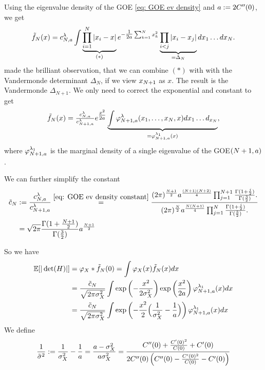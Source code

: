 Using the eigenvalue density of the GOE \eqref{eq: GOE ev density} and
\(a:=2C''(0)\), we get 
\[
	\tilde{f}_N(x)
	= c^\lambda_{N,a}\int
	\underbrace{
	\prod_{i=1}^N \left|
		x_i - x
	\right|
	}_{(*)}
	e^{-\tfrac1{2a}\sum_{k=1}^N x_k^2}
	\underbrace{\prod_{i<j}|x_i-x_j|}_{=\Delta_N} dx_1\dots dx_N.
\]
\textcite{fyodorovComplexityRandomEnergy2004} made the brilliant observation,
that we can combine \((*)\) with with the Vandermonde determinant \(\Delta_N\),
if we view \(x_{N+1}\) as \(x\). The result is the Vandermonde \(\Delta_{N+1}\).
We only need to correct the exponential and constant to get
\[
	\tilde{f}_N(x)
	= \tfrac{c^\lambda_{N, a}}{c^\lambda_{N+1,a}}
	e^{\tfrac{x^2}{2a}}
	\underbrace{\int 
	\varphi^\lambda_{N+1,a}(x_1,\dots,x_N, x)
	dx_1\dots d_{x_N}}_{=\varphi^{\lambda_1}_{N+1,a}(x)},
\]
where \(\varphi^{\lambda_1}_{N+1,a}\) is the marginal density of a single
eigenvalue of the GOE\((N+1,a)\).

We can further simplify the constant
\[\begin{aligned}
	\tilde{c}_N
	&:= \frac{c^\lambda_{N, a}}{c^\lambda_{N+1,a}}
	\overset{\eqref{eq: GOE ev density constant}}=
	\frac{
		(2\pi)^{\frac{N+1}2}a^{\frac{(N+1)(N+2)}4}
		\prod_{j=1}^{N+1} \frac{\Gamma(1+\frac{j}2)}{\Gamma(\frac32)}.
	}{
		(2\pi)^{\frac{N}2}a^{\frac{N(N+1)}4}
		\prod_{j=1}^N \frac{\Gamma(1+\frac{j}2)}{\Gamma(\frac32)}.
	}\\
	&= \sqrt{2\pi}\frac{\Gamma(1+\frac{N+1}2)}{\Gamma(\frac32)}a^{\frac{N+1}2}
\end{aligned}\]

So we have
\[\begin{aligned}
	\mathbb{E}[|\det(H)|] 
	&= \varphi_X * \tilde{f}_N(0)
	= \int \varphi_X(x)\tilde{f}_N(x)dx\\
	&= \frac{\tilde{c}_N}{\sqrt{2\pi\sigma_X^2}}
	\int \exp\left(-\frac{x^2}{2\sigma_X^2}\right)
	\exp\left( \frac{x^2}{2a} \right)\varphi^{\lambda_1}_{N+1,a}(x)dx\\
	&= \frac{\tilde{c}_N}{\sqrt{2\pi\sigma_X^2}}
	\int \exp\left(-\frac{x^2}{2}\Bigl(\frac1{\sigma_X^2}-\frac1a\Bigr)\right)
	\varphi^{\lambda_1}_{N+1,a}(x)dx
\end{aligned}\]
We define
\[
	\frac1{\tilde{\sigma}^2}
	:= \frac1{\sigma_X^2}-\frac1a
	= \frac{a - \sigma_X^2}{a\sigma_X^2}
	= \frac{C''(0)+\frac{C'(0)^2}{C(0)}+ C'(0)}{
		2C''(0)\left(C''(0) - \frac{C'(0)^2}{C(0)} - C'(0)\right)
	}
\]


